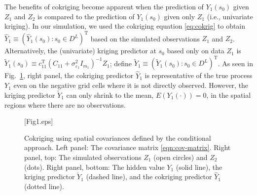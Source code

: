 \documentclass[lineno]{biometrika}
\def\T{{ \mathrm{\scriptscriptstyle T} }}
\newcommand{\Cmat} {C}
\newcommand{\cmat} {c}
\newcommand{\Imat} {I}
\newcommand{\svec} {s}
\newcommand{\Yvec}{Y}
\newcommand{\Zvec}{Z}
\newcommand{\E}{E}
\begin{document}
The benefits of cokriging become apparent when the prediction of $Y_1(\svec_0)$ given $\Zvec_1$ and $\Zvec_2$ is compared to the prediction of $Y_1(\svec_0)$ given only $\Zvec_1$ (i.e., univariate kriging). In our simulation, we used the cokriging equation \eqref{eq:cokrig} to obtain $\hat\Yvec_1 \equiv (\hat Y_1(\svec_0):\svec_0 \in D^L)^\T$ based on the simulated observations $\Zvec_1$ and $\Zvec_2$. Alternatively, the (univariate) kriging predictor at $\svec_0$ based only on data $\Zvec_1$ is $\widetilde Y_1(\svec_0) \equiv \cmat_{11}^\T(\Cmat_{11} + \sigma^2_{\varepsilon_1}\Imat_{m_1})^{-1}\Zvec_1$; define $\widetilde\Yvec_1 \equiv (\widetilde Y_1(\svec_0) : \svec_0 \in D^L)^\T$. As seen in Fig.~\ref{fig:sim}, right panel, the cokriging predictor $\hat\Yvec_1$ is representative of the true process $\Yvec_1$ even on the negative grid cells where it is not directly observed. However, the kriging predictor $\widetilde \Yvec_1$ can only shrink to the mean, $\E(Y_1(\cdot)) = 0$, in the spatial regions where there are no observations. 



\begin{figure}[!t]
\figurebox{15pc}{}{}[Fig1.eps] 
	\caption{Cokriging using spatial covariances defined by the conditional approach. Left panel: The covariance matrix \eqref{eqn:cov-matrix}. Right panel, top: The simulated observations $\Zvec_1$ (open circles) and $\Zvec_2$ (dots). Right panel, bottom: The hidden value $\Yvec_1$ (solid line), the kriging predictor $\widetilde\Yvec_1$ (dashed line), and the cokriging predictor $\hat\Yvec_1$ (dotted line).} \label{fig:sim}
\end{figure}
\end{document}
